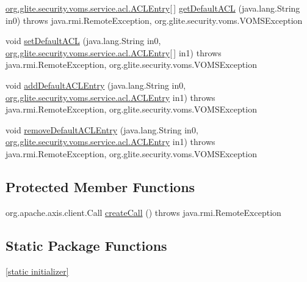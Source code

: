 \begin{DoxyCompactItemize}
\hyperlink{classorg_1_1glite_1_1security_1_1voms_1_1service_1_1acl_1_1ACLEntry}{org.glite.security.voms.service.acl.ACLEntry}\mbox{[}$\,$\mbox{]} \hyperlink{classorg_1_1glite_1_1security_1_1voms_1_1service_1_1acl_1_1VOMSACLSoapBindingStub_ab4ef2248a43a1cc9bab14c03334843df}{getDefaultACL} (java.lang.String in0)  throws java.rmi.RemoteException, org.glite.security.voms.VOMSException 
\item 
void \hyperlink{classorg_1_1glite_1_1security_1_1voms_1_1service_1_1acl_1_1VOMSACLSoapBindingStub_a3df9eb65a23828d2ac020cc2c39e7758}{setDefaultACL} (java.lang.String in0, \hyperlink{classorg_1_1glite_1_1security_1_1voms_1_1service_1_1acl_1_1ACLEntry}{org.glite.security.voms.service.acl.ACLEntry}\mbox{[}$\,$\mbox{]} in1)  throws java.rmi.RemoteException, org.glite.security.voms.VOMSException 
\item 
void \hyperlink{classorg_1_1glite_1_1security_1_1voms_1_1service_1_1acl_1_1VOMSACLSoapBindingStub_a339813230158ff6e45afee1bfb8869dd}{addDefaultACLEntry} (java.lang.String in0, \hyperlink{classorg_1_1glite_1_1security_1_1voms_1_1service_1_1acl_1_1ACLEntry}{org.glite.security.voms.service.acl.ACLEntry} in1)  throws java.rmi.RemoteException, org.glite.security.voms.VOMSException 
\item 
void \hyperlink{classorg_1_1glite_1_1security_1_1voms_1_1service_1_1acl_1_1VOMSACLSoapBindingStub_af4775df776247f099ceb5143e12f9913}{removeDefaultACLEntry} (java.lang.String in0, \hyperlink{classorg_1_1glite_1_1security_1_1voms_1_1service_1_1acl_1_1ACLEntry}{org.glite.security.voms.service.acl.ACLEntry} in1)  throws java.rmi.RemoteException, org.glite.security.voms.VOMSException 
\end{DoxyCompactItemize}
\subsection*{Protected Member Functions}
\begin{DoxyCompactItemize}
\item 
org.apache.axis.client.Call \hyperlink{classorg_1_1glite_1_1security_1_1voms_1_1service_1_1acl_1_1VOMSACLSoapBindingStub_a7e3259b2df1531b0c1f7fc4b436aa592}{createCall} ()  throws java.rmi.RemoteException 
\end{DoxyCompactItemize}
\subsection*{Static Package Functions}
\begin{DoxyCompactItemize}
\item 
\hyperlink{classorg_1_1glite_1_1security_1_1voms_1_1service_1_1acl_1_1VOMSACLSoapBindingStub_a1797f57c5d07660a3d4bb0f34e0ac450}{\mbox{[}static initializer\mbox{]}}
\end{DoxyCompactItemize}
